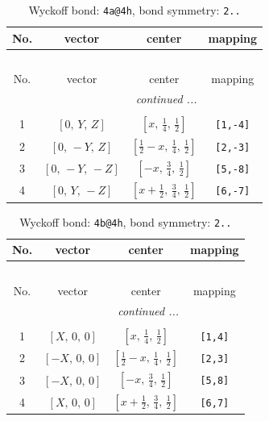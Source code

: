 \documentclass[fleqn,8pt]{jsarticle}
\begin{document}
\begin{longtable}{cccc}
\caption{Wyckoff bond: {\tt 4a@4h}, bond symmetry: {\tt 2..}}
 \\
 \hline \hline
No. & vector & center & mapping \\ \hline \endfirsthead

\multicolumn{3}{l}{\tablename\ \thetable{}} \\
 \hline \hline
No. & vector & center & mapping \\ \hline \endhead

 \hline \hline
\multicolumn{3}{r}{\footnotesize\it continued ...} \\ \endfoot

 \hline \hline
\multicolumn{3}{r}{} \\ \endlastfoot

1 & $\left[ 0,\, Y,\, Z \right]$ & $\left[ x,\, \frac{1}{4},\, \frac{1}{2} \right]$ & {\tt [1,-4]} \\ \hline
2 & $\left[ 0,\, - Y,\, Z \right]$ & $\left[ \frac{1}{2} - x,\, \frac{1}{4},\, \frac{1}{2} \right]$ & {\tt [2,-3]} \\ \hline
3 & $\left[ 0,\, - Y,\, - Z \right]$ & $\left[ - x,\, \frac{3}{4},\, \frac{1}{2} \right]$ & {\tt [5,-8]} \\ \hline
4 & $\left[ 0,\, Y,\, - Z \right]$ & $\left[ x + \frac{1}{2},\, \frac{3}{4},\, \frac{1}{2} \right]$ & {\tt [6,-7]} \\
\end{longtable}
\renewcommand{\arraystretch}{1.2}
\begin{longtable}{cccc}
\caption{Wyckoff bond: {\tt 4b@4h}, bond symmetry: {\tt 2..}}
 \\
 \hline \hline
No. & vector & center & mapping \\ \hline \endfirsthead

\multicolumn{3}{l}{\tablename\ \thetable{}} \\
 \hline \hline
No. & vector & center & mapping \\ \hline \endhead

 \hline \hline
\multicolumn{3}{r}{\footnotesize\it continued ...} \\ \endfoot

 \hline \hline
\multicolumn{3}{r}{} \\ \endlastfoot

1 & $\left[ X,\, 0,\, 0 \right]$ & $\left[ x,\, \frac{1}{4},\, \frac{1}{2} \right]$ & {\tt [1,4]} \\ \hline
2 & $\left[ - X,\, 0,\, 0 \right]$ & $\left[ \frac{1}{2} - x,\, \frac{1}{4},\, \frac{1}{2} \right]$ & {\tt [2,3]} \\ \hline
3 & $\left[ - X,\, 0,\, 0 \right]$ & $\left[ - x,\, \frac{3}{4},\, \frac{1}{2} \right]$ & {\tt [5,8]} \\ \hline
4 & $\left[ X,\, 0,\, 0 \right]$ & $\left[ x + \frac{1}{2},\, \frac{3}{4},\, \frac{1}{2} \right]$ & {\tt [6,7]} \\
\end{longtable}
\end{document}

